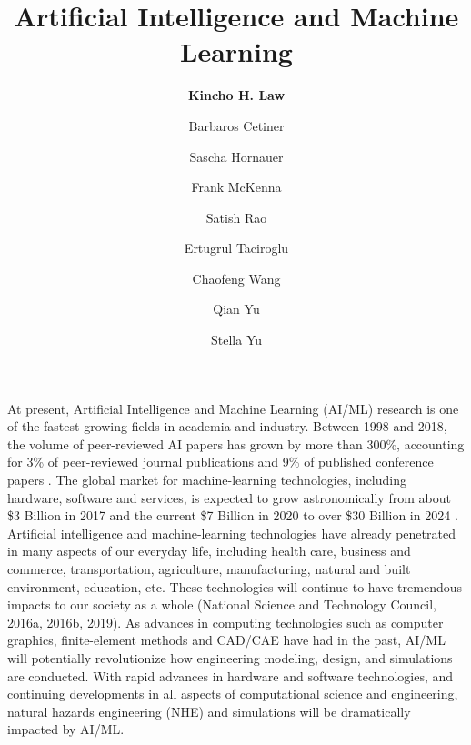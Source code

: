 %
%
%


\title{Artificial Intelligence and Machine Learning}
\author{
    \textbf{Kincho H. Law}
    \and {Barbaros Cetiner}
    \and {Sascha Hornauer}
    \and {Frank McKenna}
    \and {Satish Rao}
    \and {Ertugrul Taciroglu}
    \and {Chaofeng Wang}
    \and {Qian Yu}
    \and {Stella Yu}}
\tocauthor{}
%
%
\maketitle
\label{chapter:cc_aiml}

At present, Artificial Intelligence and Machine Learning (AI/ML) research is one of the fastest-growing fields in academia and industry. Between 1998 and 2018, the volume of peer-reviewed AI papers has grown by more than 300\%, accounting for 3\% of peer-reviewed journal publications and 9\% of published conference papers \citep{perrault2019ai}. The global market for machine-learning technologies, including hardware, software and services, is expected to grow astronomically from about \$3 Billion in 2017 and the current \$7 Billion in 2020 to over \$30 Billion in 2024 \citep{mrf2019machine}. Artificial intelligence and machine-learning technologies have already penetrated in many aspects of our everyday life, including health care, business and commerce, transportation, agriculture, manufacturing, natural and built environment, education, etc. These technologies will continue to have tremendous impacts to our society as a whole (National Science and Technology Council, 2016a, 2016b, 2019). As advances in computing technologies such as computer graphics, finite-element methods and CAD/CAE have had in the past, AI/ML will potentially revolutionize how engineering modeling, design, and simulations are conducted. With rapid advances in hardware and software technologies, and continuing developments in all aspects of computational science and engineering, natural hazards engineering (NHE) and simulations will be dramatically impacted by AI/ML.

